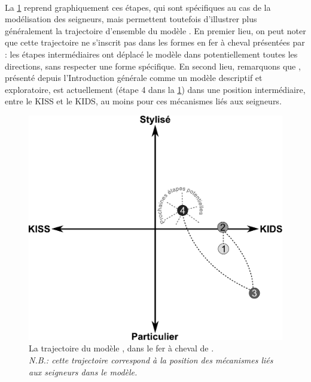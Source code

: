 \paragraph[ccltemps]{}
La \cref{fig:trajectoire-simfeodal} reprend graphiquement ces étapes, qui sont spécifiques au cas de la modélisation des seigneurs, mais permettent toutefois d'illustrer plus généralement la trajectoire d'ensemble du modèle \simfeodal{}.
En premier lieu, on peut noter que cette trajectoire ne s'inscrit pas dans les formes \og en fer à cheval\fg{} présentées par \textcite{banos2013modeliser} :
	les étapes intermédiaires ont \og déplacé\fg{} le modèle dans potentiellement toutes les directions, sans respecter une forme spécifique.
En second lieu, remarquons que \simfeodal{}, présenté depuis l'Introduction générale comme un modèle descriptif et exploratoire, est actuellement (étape 4 dans la \cref{fig:trajectoire-simfeodal}) dans une position intermédiaire, entre le KISS et le KIDS, au moins pour ces mécanismes liés aux seigneurs. 


\begin{figure}[H]
	\centering
	\includegraphics[width=.8\linewidth]{img/trajectoire_simfeodal.pdf}
	\caption[La trajectoire du modèle \simfeodal{}, dans le \og fer à cheval\fg{} de \textcite{banos2013modeliser}.]{La trajectoire du modèle \simfeodal{}, dans le \og fer à cheval\fg{} de \textcite{banos2013modeliser}.\\
	\textit{N.B.: cette trajectoire correspond à la position des mécanismes liés aux seigneurs dans le modèle.}}
	\label{fig:trajectoire-simfeodal}
\end{figure}



